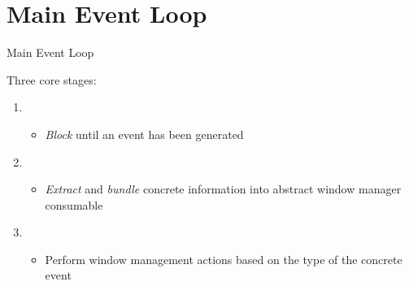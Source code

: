 
\section{Main Event Loop}

\begin{frame}[t]{Main Event Loop}

    Three core stages:

    \begin{enumerate}
        \itemsep.3em

        \item {}
            \begin{itemize}
                \item \textit{Block} until an event has been generated
            \end{itemize}

        \item {}
            \begin{itemize}
                \item \textit{Extract} and \textit{bundle} concrete information into abstract window manager consumable
            \end{itemize}

        \item {}
            \begin{itemize}
                \item Perform window management actions based on the type of the concrete event
            \end{itemize}

    \end{enumerate}

    \vfill

\end{frame}

